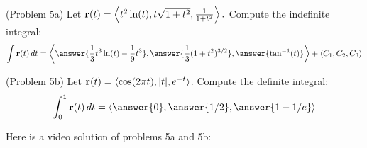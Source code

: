 \documentclass[handout]{ximera}
\begin{document}
\begin{problem}(Problem 5a)
Let $\mathbf r(t) = \left\langle t^2\ln(t),t\sqrt{1+t^2},\frac{1}{1+t^2}\right\rangle.$ Compute the indefinite integral:
\[
\int \vec r(t) \, dt = \vector{\answer{\frac13 t^3 \ln(t) - \frac19 t^3},\answer{\frac13 (1+t^2)^{3/2}},\answer{\tan^{-1}(t)}} + \vector{C_1, C_2, C_3}
\]

\end{problem}

\begin{problem}(Problem 5b)
Let $\mathbf r(t) = \left\langle \cos(2\pi t),|t|,e^{-t}\right\rangle$. Compute the definite integral:
\[
\int_0^1 \vec r(t) \, dt = \vector{\answer{0}, \answer{1/2}, \answer{1 - 1/e}}
\]
\end{problem}

Here is a video solution of problems 5a and 5b:\\
\begin{foldable}
\end{foldable}
\end{document}
